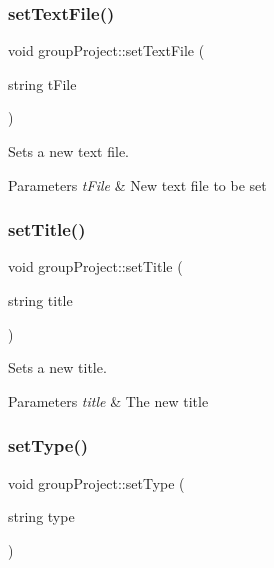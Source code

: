 \subsubsection{\texorpdfstring{set\+Text\+File()}{setTextFile()}}
{\footnotesize\ttfamily void group\+Project\+::set\+Text\+File (\begin{DoxyParamCaption}\item[{string}]{t\+File }\end{DoxyParamCaption})}



Sets a new text file. 


\begin{DoxyParams}{Parameters}
{\em t\+File} & New text file to be set \\
\hline
\end{DoxyParams}
\mbox{\label{classgroup_project_ab242628894adcdc4361fc24b676afcf0}} 
\subsubsection{\texorpdfstring{set\+Title()}{setTitle()}}
{\footnotesize\ttfamily void group\+Project\+::set\+Title (\begin{DoxyParamCaption}\item[{string}]{title }\end{DoxyParamCaption})}



Sets a new title. 


\begin{DoxyParams}{Parameters}
{\em title} & The new title \\
\hline
\end{DoxyParams}
\mbox{\label{classgroup_project_a25ac89777b6217e2ec9f751ec303601d}} 
\subsubsection{\texorpdfstring{set\+Type()}{setType()}}
{\footnotesize\ttfamily void group\+Project\+::set\+Type (\begin{DoxyParamCaption}\item[{string}]{type }\end{DoxyParamCaption})}



